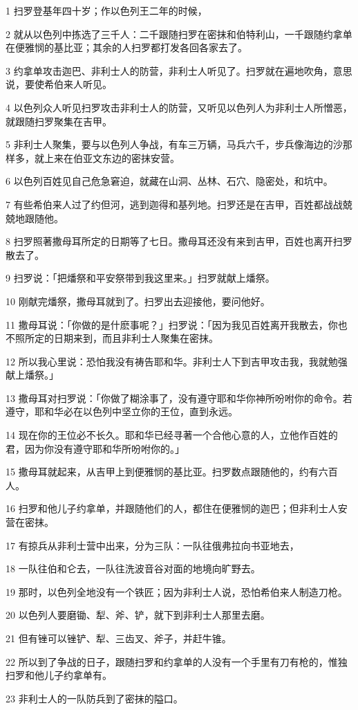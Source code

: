 \par 1 扫罗登基年四十岁；作以色列王二年的时候，
\par 2 就从以色列中拣选了三千人：二千跟随扫罗在密抹和伯特利山，一千跟随约拿单在便雅悯的基比亚；其余的人扫罗都打发各回各家去了。
\par 3 约拿单攻击迦巴、非利士人的防营，非利士人听见了。扫罗就在遍地吹角，意思说，要使希伯来人听见。
\par 4 以色列众人听见扫罗攻击非利士人的防营，又听见以色列人为非利士人所憎恶，就跟随扫罗聚集在吉甲。
\par 5 非利士人聚集，要与以色列人争战，有车三万辆，马兵六千，步兵像海边的沙那样多，就上来在伯亚文东边的密抹安营。
\par 6 以色列百姓见自己危急窘迫，就藏在山洞、丛林、石穴、隐密处，和坑中。
\par 7 有些希伯来人过了约但河，逃到迦得和基列地。扫罗还是在吉甲，百姓都战战兢兢地跟随他。
\par 8 扫罗照著撒母耳所定的日期等了七日。撒母耳还没有来到吉甲，百姓也离开扫罗散去了。
\par 9 扫罗说：「把燔祭和平安祭带到我这里来。」扫罗就献上燔祭。
\par 10 刚献完燔祭，撒母耳就到了。扫罗出去迎接他，要问他好。
\par 11 撒母耳说：「你做的是什麽事呢？」扫罗说：「因为我见百姓离开我散去，你也不照所定的日期来到，而且非利士人聚集在密抹。
\par 12 所以我心里说：恐怕我没有祷告耶和华。非利士人下到吉甲攻击我，我就勉强献上燔祭。」
\par 13 撒母耳对扫罗说：「你做了糊涂事了，没有遵守耶和华你神所吩咐你的命令。若遵守，耶和华必在以色列中坚立你的王位，直到永远。
\par 14 现在你的王位必不长久。耶和华已经寻著一个合他心意的人，立他作百姓的君，因为你没有遵守耶和华所吩咐你的。」
\par 15 撒母耳就起来，从吉甲上到便雅悯的基比亚。扫罗数点跟随他的，约有六百人。
\par 16 扫罗和他儿子约拿单，并跟随他们的人，都住在便雅悯的迦巴；但非利士人安营在密抹。
\par 17 有掠兵从非利士营中出来，分为三队：一队往俄弗拉向书亚地去，
\par 18 一队往伯和仑去，一队往洗波音谷对面的地境向旷野去。
\par 19 那时，以色列全地没有一个铁匠；因为非利士人说，恐怕希伯来人制造刀枪。
\par 20 以色列人要磨锄、犁、斧、铲，就下到非利士人那里去磨。
\par 21 但有锉可以锉铲、犁、三齿叉、斧子，并赶牛锥。
\par 22 所以到了争战的日子，跟随扫罗和约拿单的人没有一个手里有刀有枪的，惟独扫罗和他儿子约拿单有。
\par 23 非利士人的一队防兵到了密抹的隘口。

